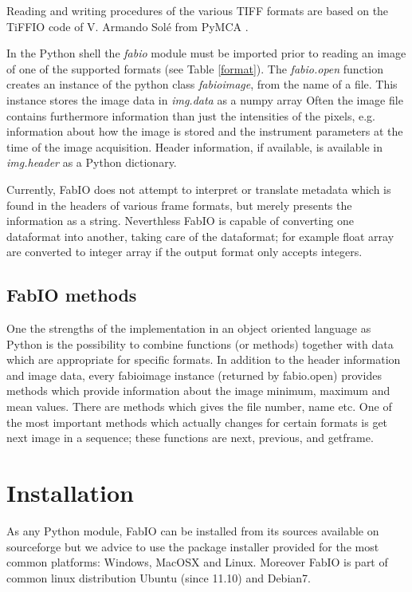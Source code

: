 \documentclass{iucr}
\begin{document}
Reading and writing procedures of the various TIFF \cite{tiff} formats are based on the
TiFFIO code of V. Armando Sol\'e from PyMCA \cite{pymca}.

In the Python shell the {\em fabio} module must be imported prior to reading an
image of one of the supported formats (see Table \ref{format}).
The {\em fabio.open} function creates an instance of the python class {\em fabioimage},
from the name of a file.
This instance stores the image data in {\em img.data} as a numpy array
Often the image file contains furthermore information than just
the intensities of the pixels, e.g. information about how the image is
stored and the instrument parameters at the time of the image acquisition.
Header information, if available, is available in {\em img.header} as a Python
dictionary.

Currently, FabIO does not attempt to interpret or translate metadata which
is found in the headers of various frame formats, but merely presents the
information as a string. Neverthless FabIO is capable of converting one
dataformat into another, taking care of the dataformat; for example float array
are converted to integer array if the output format only accepts integers.


\subsection{FabIO methods}

One the strengths of the implementation in an object oriented language as Python
is the possibility to combine functions (or methods) together with data which
are appropriate for specific formats.
In addition to the header information and image data, every fabioimage instance
(returned by fabio.open) provides methods which provide information about the image minimum, maximum and mean values.
There are methods which gives the file number, name etc. One of the most important methods which  actually changes for certain formats
is get next image in a sequence; these functions are next, previous, and
getframe.


\section{Installation}

As any Python module, FabIO can be installed from its sources available on sourceforge\cite{fabio}
but we advice to use the package installer provided for the most common
platforms: Windows, MacOSX and Linux. Moreover FabIO is part of common linux
distribution Ubuntu (since 11.10) and Debian7.
\end{document}

